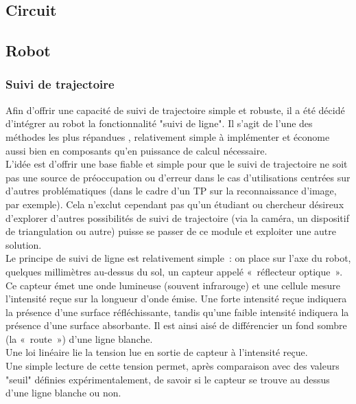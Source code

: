 \subsection{Circuit}


\subsection{Robot}

	\subsubsection{Suivi de trajectoire}

		Afin d’offrir une capacité de suivi de trajectoire simple et robuste, il a été décidé d’intégrer au robot la fonctionnalité "suivi de ligne". Il s’agit de l’une des méthodes les plus répandues\cite{bib3} \cite{bib4}, relativement simple à implémenter et économe aussi bien en composants qu’en puissance de calcul nécessaire.\\

		L’idée est d’offrir une base fiable et simple pour que le suivi de trajectoire ne soit pas une source de préoccupation ou d’erreur dans le cas d'utilisations centrées sur d’autres problématiques (dans le cadre d'un TP sur la reconnaissance d'image, par exemple). Cela n’exclut cependant pas qu’un étudiant ou chercheur désireux d’explorer d’autres possibilités de suivi de trajectoire (via la caméra, un dispositif de triangulation ou autre) puisse se passer de ce module et exploiter une autre solution.\\

		Le principe de suivi de ligne est relativement simple : on place sur l’axe du robot, quelques millimètres au-dessus du sol, un capteur appelé « réflecteur optique ». Ce capteur émet une onde lumineuse (souvent infrarouge) et une cellule mesure l’intensité reçue sur la longueur d’onde émise. Une forte intensité reçue indiquera la présence d’une surface réfléchissante, tandis qu’une faible intensité indiquera la présence d’une surface absorbante. Il est ainsi aisé de différencier un fond sombre (la « route ») d’une ligne blanche.\\

		Une loi linéaire lie la tension lue en sortie de capteur à l'intensité reçue.\\
		Une simple lecture de cette tension permet, après comparaison avec des valeurs "seuil" définies expérimentalement, de savoir si le capteur se trouve au dessus d'une ligne blanche ou non.\\

